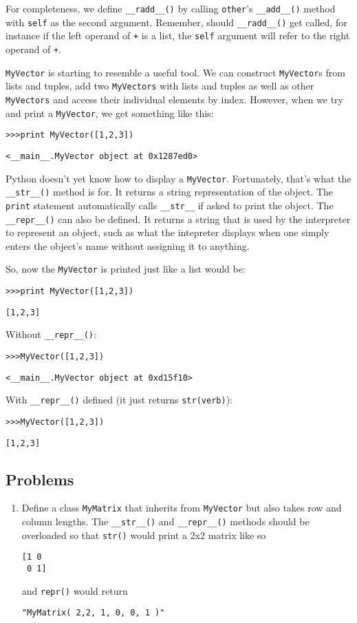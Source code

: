 For completeness, we define \verb|__radd__()| by calling \verb|other|'s \verb|__add__()| method with  \verb|self| as the second argument. Remember, should \verb|__radd__()| get called, for instance if the left operand of \verb|+| is a list, the \verb|self| argument will refer to the right operand of \verb|+|.

\verb|MyVector| is starting to resemble a useful tool. We can construct \verb|MyVector|s from lists and tuples, add two \verb|MyVectors| with lists and tuples as well as other \verb|MyVectors| and access their individual elements by index. However, when we try and print a \verb|MyVector|, we get something like this: 

\verb|>>>print MyVector([1,2,3])|

\verb|<__main__.MyVector object at 0x1287ed0>|

Python doesn't yet know how to display a \verb|MyVector|. Fortunately, that's what the \verb|__str__()| method is for. It returns a string representation of the object. The \verb|print| statement automatically calls \verb|__str__| if asked to print the object. The \verb|__repr__()| can also be defined. It returns a string that is used by the interpreter to represent an object, such as what the intepreter displays when one simply enters the object's name without assigning it to anything.



So, now the \verb|MyVector| is printed just like a list would be:

\verb|>>>print MyVector([1,2,3])|

\verb|[1,2,3]|

Without \verb|__repr__()|:

\verb|>>>MyVector([1,2,3])|

\verb|<__main__.MyVector object at 0xd15f10>|

With \verb|__repr__()| defined (it just returns \verb|str(verb)|):

\verb|>>>MyVector([1,2,3])|

\verb|[1,2,3]|

\subsection{Problems}

\begin{enumerate}

	\item Define a class \verb|MyMatrix| that inherits from \verb|MyVector| but also takes row and column lengths. The \verb|__str__()| and \verb|__repr__()| methods should be overloaded so that \verb|str()| would print a 2x2 matrix like so

\begin{verbatim}
[1 0
 0 1]
\end{verbatim}

and \verb|repr()| would return

\verb|"MyMatrix( 2,2, 1, 0, 0, 1 )"|

\end{enumerate}

